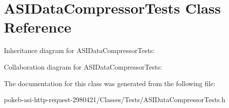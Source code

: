 \hypertarget{interface_a_s_i_data_compressor_tests}{
\section{\-A\-S\-I\-Data\-Compressor\-Tests \-Class \-Reference}
\label{interface_a_s_i_data_compressor_tests}
}


\-Inheritance diagram for \-A\-S\-I\-Data\-Compressor\-Tests\-:


\-Collaboration diagram for \-A\-S\-I\-Data\-Compressor\-Tests\-:


\-The documentation for this class was generated from the following file\-:\begin{DoxyCompactItemize}
\item 
pokeb-\/asi-\/http-\/request-\/2980421/\-Classes/\-Tests/\-A\-S\-I\-Data\-Compressor\-Tests.\-h\end{DoxyCompactItemize}
